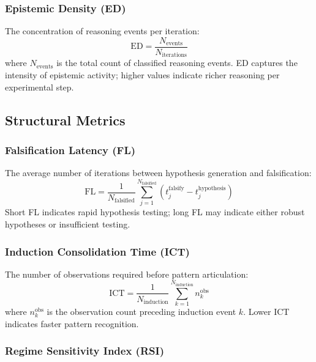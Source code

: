 \documentclass[10pt,twocolumn]{article}
\begin{document}
\subsubsection{Epistemic Density (ED)}

The concentration of reasoning events per iteration:
\begin{equation}
    \text{ED} = \frac{N_{\text{events}}}{N_{\text{iterations}}}
\end{equation}
where $N_{\text{events}}$ is the total count of classified reasoning events. ED captures the intensity of epistemic activity; higher values indicate richer reasoning per experimental step.

\subsection{Structural Metrics}

\subsubsection{Falsification Latency (FL)}

The average number of iterations between hypothesis generation and falsification:
\begin{equation}
    \text{FL} = \frac{1}{N_{\text{falsified}}} \sum_{j=1}^{N_{\text{falsified}}} (t_j^{\text{falsify}} - t_j^{\text{hypothesis}})
\end{equation}
Short FL indicates rapid hypothesis testing; long FL may indicate either robust hypotheses or insufficient testing.

\subsubsection{Induction Consolidation Time (ICT)}

The number of observations required before pattern articulation:
\begin{equation}
    \text{ICT} = \frac{1}{N_{\text{induction}}} \sum_{k=1}^{N_{\text{induction}}} n_k^{\text{obs}}
\end{equation}
where $n_k^{\text{obs}}$ is the observation count preceding induction event $k$. Lower ICT indicates faster pattern recognition.

\subsubsection{Regime Sensitivity Index (RSI)}
\end{document}
